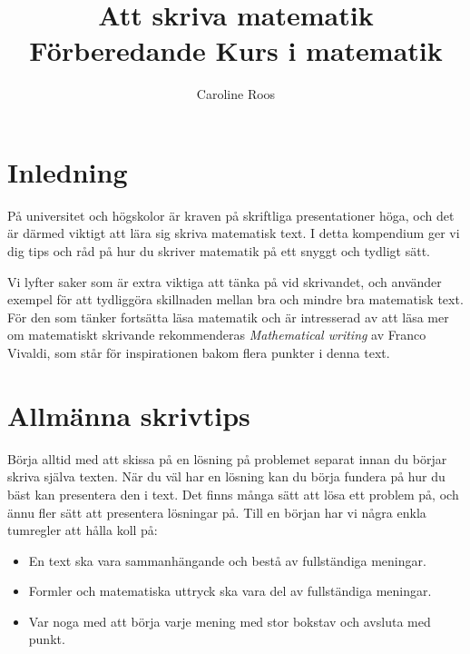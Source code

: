 \documentclass[titlepage]{article}
\title{Att skriva matematik \\ \normalsize Förberedande Kurs i matematik}
\author{Caroline Roos}
\date{}
\begin{document}
\begin{titlepage}
    \maketitle
\end{titlepage}

\tableofcontents
\thispagestyle{empty}



\newpage
\setcounter{page}{1}

\section{Inledning}

På universitet och högskolor är kraven på skriftliga presentationer höga, och det är därmed viktigt att lära sig skriva matematisk text. I detta kompendium ger vi dig tips och råd på hur du skriver matematik på ett snyggt och tydligt sätt.

Vi lyfter saker som är extra viktiga att tänka på vid skrivandet, och använder exempel för att tydliggöra skillnaden mellan bra och mindre bra matematisk text. För den som tänker fortsätta läsa matematik och är intresserad av att läsa mer om matematiskt skrivande rekommenderas \textit{Mathematical writing} av Franco Vivaldi\cite{vivaldi}, som står för inspirationen bakom flera punkter i denna text.



\section{Allmänna skrivtips}

Börja alltid med att skissa på en lösning på problemet separat innan du börjar skriva själva texten. När du väl har en lösning kan du börja fundera på hur du bäst kan presentera den i text. Det finns många sätt att lösa ett problem på, och ännu fler sätt att presentera lösningar på. Till en början har vi några enkla tumregler att hålla koll på:

\begin{itemize}
    \item En text ska vara sammanhängande och bestå av fullständiga meningar.
    \item Formler och matematiska uttryck ska vara del av fullständiga meningar.
    \item Var noga med att börja varje mening med stor bokstav och avsluta med punkt.
\end{itemize}
\end{document}
